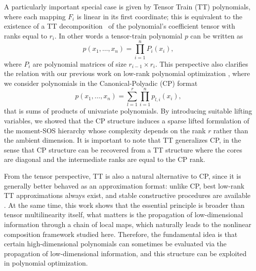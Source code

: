\documentclass[11pt,a4paper]{article}
\theoremstyle{definition}
\begin{document}
A particularly important special case is given by Tensor Train (TT) polynomials, where each mapping $F_i$ is linear in its first coordinate; this is equivalent to the existence of a TT decomposition~\cite{oseledets2011tensor} of the polynomial’s coefficient tensor with ranks equal to $r_i$. In other words a tensor-train polynomial $p$ can be written as \begin{equation}\label{ttpol}
p(x_1,\ldots,x_n) = \prod_{i=1}^n P_i(x_i),
\end{equation}
where $P_i$ are polynomial matrices of size $r_{i-1}\times r_{i}$. This perspective also clarifies the relation with our previous work on low-rank polynomial optimization \cite{LRPOP25}, where we consider polynomials in the Canonical-Polyadic (CP) format
\[
p(x_1,\ldots,x_n) = \sum_{l=1}^r\prod_{i=1}^n p_{l,i}(x_i),
\]
that is sums of products of univariate polynomials. By introducing suitable lifting variables, we showed that the CP structure induces a sparse lifted formulation of the moment-SOS hierarchy whose complexity depends on the rank $r$ rather than the ambient dimension. It is important to note that TT generalizes CP, in the sense that CP structure can be recovered from a TT structure where the cores are diagonal and the intermediate ranks are equal to the CP rank. 

From the tensor perspective, TT is also a natural alternative to CP, since it is generally better behaved as an approximation format: unlike CP, best low-rank TT approximations always exist, and stable constructive procedures are available \cite{oseledets2011tensor,deSilvaLim08}. At the same time, this work shows that the essential principle is broader than tensor multilinearity itself, what matters is the propagation of low-dimensional information through a chain of local maps, which naturally leads to the nonlinear composition framework studied here. Therefore, the fundamental idea is that certain high-dimensional polynomials can sometimes be evaluated via the propagation of low-dimensional information, and this structure can be exploited in polynomial optimization.
\end{document}
